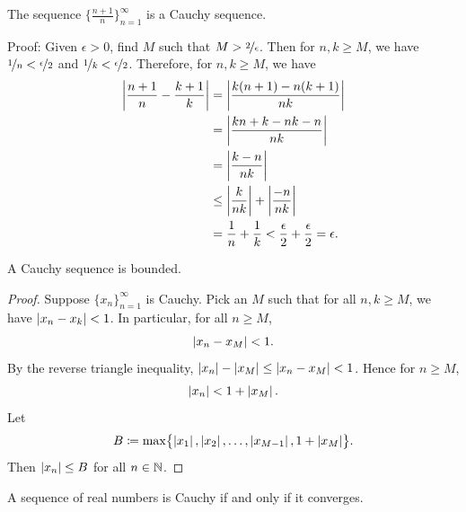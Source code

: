 \begin{example}
The sequence $\{ \frac{n+1}{n} \}_{n=1}^\infty$ is a Cauchy sequence.

Proof:  Given $\epsilon > 0$, find $M$ such that
$M > \nicefrac{2}{\epsilon}$.  Then for $n,k \geq M$,
we have $\nicefrac{1}{n} < \nicefrac{\epsilon}{2}$
and
$\nicefrac{1}{k} < \nicefrac{\epsilon}{2}$.  Therefore, for $n, k \geq M$,
we have
\begin{equation*}
\begin{split}
\left\lvert {\frac{n+1}{n} - \frac{k+1}{k}} \right\rvert
& =
\left\lvert {\frac{k(n+1)-n(k+1)}{nk}} \right\rvert
\\
& =
\left\lvert {\frac{kn+k-nk-n}{nk}} \right\rvert
\\
& =
\left\lvert {\frac{k-n}{nk}} \right\rvert
\\
& \leq
\left\lvert {\frac{k}{nk}} \right\rvert
+
\left\lvert {\frac{-n}{nk}} \right\rvert
\\
& = \frac{1}{n} + \frac{1}{k}
< \frac{\epsilon}{2} + \frac{\epsilon}{2} = \epsilon .
\end{split}
\end{equation*}
\end{example}

\begin{prop}
A Cauchy sequence is bounded.
\end{prop}

\begin{proof}
Suppose $\{ x_n \}_{n=1}^\infty$ is Cauchy.  Pick an $M$ such that for all
$n,k \geq M$, we have $\left\lvert {x_n-x_k} \right\rvert < 1$.  In particular, 
for all $n \geq M$,
\begin{equation*}
\left\lvert {x_n - x_M} \right\rvert < 1 .
\end{equation*}
By the reverse triangle inequality,
$\left\lvert {x_n} \right\rvert - \left\lvert {x_M} \right\rvert \leq \left\lvert {x_n - x_M} \right\rvert < 1$.  Hence for $n \geq M$,
\begin{equation*}
\left\lvert {x_n} \right\rvert < 1 + \left\lvert {x_M} \right\rvert.
\end{equation*}
Let
\begin{equation*}
B \coloneqq \max \bigl\{ \left\lvert {x_1} \right\rvert, \left\lvert {x_2} \right\rvert, \ldots, \left\lvert {x_{M-1}} \right\rvert, 1+ \left\lvert {x_M} \right\rvert \bigr\} .
\end{equation*}
Then $\left\lvert {x_n} \right\rvert \leq B$ for all $n \in {\mathbb{N}}$.
\end{proof}

\begin{thm}
A sequence of real numbers is Cauchy if and only if it converges.
\end{thm}

